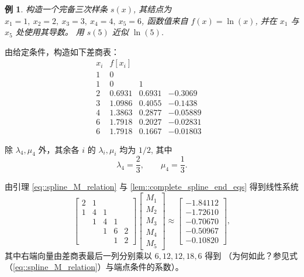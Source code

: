 \documentclass[a4paper]{ctexart}
\newtheorem{example}[theorem]{例}
\numberwithin{theorem}{section}
\numberwithin{equation}{section}
\numberwithin{figure}{section}
\numberwithin{remark}{section}
\begin{document}
\begin{example}
    \label{ex::complete_cubic_ln}
构造一个完备三次样条 $s(x)$, 
其结点为 $x_1=1,\ x_2=2,\ x_3=3,\ x_4=4,\ x_5=6$, 
函数值来自 $f(x)=\ln(x)$, 并在 $x_1$ 与 $x_5$ 处使用其导数。
用 $s(5)$ 近似 $\ln(5)$.
\end{example}

由给定条件，构造如下差商表：
\[
\begin{array}{c|cccc}
x_i & f[x_i] & & & \\
\hline
1 & 0 \\
1 & 0 & 1 \\
2 & 0.6931 & 0.6931 & -0.3069 \\
3 & 1.0986 & 0.4055 & -0.1438 \\
4 & 1.3863 & 0.2877 & -0.05889 \\
6 & 1.7918 & 0.2027 & -0.02831 \\
6 & 1.7918 & 0.1667 & -0.01803
\end{array}
\]

除 $\lambda_4,\mu_4$ 外，其余各 $i$ 的 $\lambda_i,\mu_i$ 均为 $1/2$, 其中
\begin{equation*}
\lambda_4=\frac{2}{3},\qquad \mu_4=\frac{1}{3}.
\end{equation*}

由引理 \ref{eq::spline_M_relation} 与 \ref{lem::complete_spline_end_eqs} 
得到线性系统
\begin{equation*}
\begin{bmatrix}
2 & 1 \\
1 & 4 & 1 \\
& 1 & 4 & 1 \\
& & 1 & 6 & 2 \\
& & & 1 & 2
\end{bmatrix}
\begin{bmatrix}
M_1\\ M_2\\ M_3\\ M_4\\ M_5
\end{bmatrix}
\approx
\begin{bmatrix}
-1.84112\\
-1.72610\\
-0.70670\\
-0.50967\\
-0.10820
\end{bmatrix},
\end{equation*}
其中右端向量由差商表最后一列分别乘以 $6,12,12,18,6$ 得到
（为何如此？参见式（\ref{eq::spline_M_relation}）与端点条件的系数）。
\end{document}
